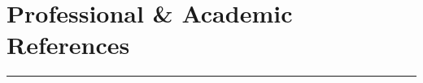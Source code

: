 \documentclass[10pt]{article}
\newcommand{\newsection}[2]{%
  \section*{#1}
  \vspace{-.1in}
  \hrule
  \vspace{.2in}
  \label{sec:#2}
}
\begin{document}


\newsection{Professional \& Academic References}{references}


%
%
%

\pagestyle{empty}
\end{document}
